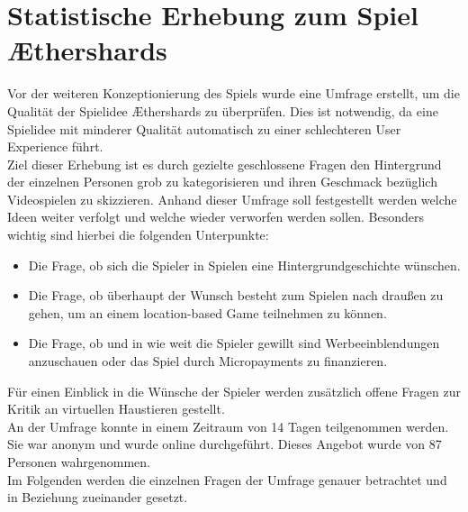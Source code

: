 \section{Statistische Erhebung zum Spiel Æthershards}
Vor der weiteren Konzeptionierung des Spiels wurde eine Umfrage erstellt, um die Qualität der Spielidee Æthershards zu überprüfen. Dies ist notwendig, da eine Spielidee mit minderer Qualität automatisch zu einer schlechteren User Experience führt. \\
Ziel dieser Erhebung ist es durch gezielte geschlossene Fragen den Hintergrund der einzelnen Personen grob zu kategorisieren und ihren Geschmack bezüglich Videospielen zu skizzieren. Anhand dieser Umfrage soll festgestellt werden welche Ideen weiter verfolgt und welche wieder verworfen werden sollen. Besonders wichtig sind hierbei die folgenden Unterpunkte:
\begin{itemize}
\item Die Frage, ob sich die Spieler in Spielen eine Hintergrundgeschichte wünschen.
\item Die Frage, ob überhaupt der Wunsch besteht zum Spielen nach draußen zu gehen, um an einem location-based Game teilnehmen zu können.
\item Die Frage, ob und in wie weit die Spieler gewillt sind Werbeeinblendungen anzuschauen oder das Spiel durch Micropayments zu finanzieren.
\end{itemize}
Für einen Einblick in die Wünsche der Spieler werden zusätzlich offene Fragen zur Kritik an virtuellen Haustieren gestellt. \\
An der Umfrage konnte in einem Zeitraum von 14 Tagen teilgenommen werden. Sie war anonym und wurde online durchgeführt. Dieses Angebot wurde von 87 Personen wahrgenommen. \\
Im Folgenden werden die einzelnen Fragen der Umfrage genauer betrachtet und in Beziehung zueinander gesetzt.



